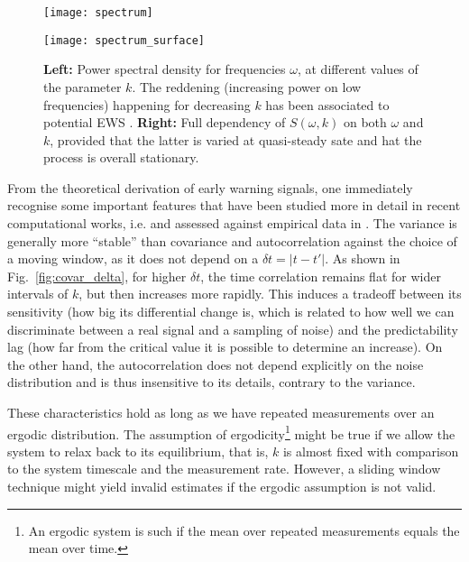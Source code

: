 \begin{figure}[h]
	\centering
	
	\begin{minipage}[c]{0.47\textwidth}
		\texttt{[image: spectrum]}
		\renewcommand{\figurename}{Fig.}
	\end{minipage}
	\hspace{0.01cm}
	\begin{minipage}[c]{0.47\textwidth}
		\texttt{[image: spectrum\_surface]}
		\renewcommand{\figurename}{Fig.}
	\end{minipage} 
	
	\caption{\small \textbf{Left:} Power spectral density for frequencies $\omega$, at different values of the parameter $k$. The reddening (increasing power on low frequencies) happening for decreasing $k$ has been associated to potential \gls{EWS} \citep{thompson2011predicting,biggs2009turning}. \textbf{Right:} Full dependency of $S(\omega,k)$ on both $\omega$ and $k$, provided that the latter is varied at quasi-steady sate and hat the process is overall stationary.}
	\label{fig:spectral_reddening}
\end{figure}


From the theoretical derivation of early warning signals, one immediately recognise some important features that have been studied more in detail in recent computational works, i.e. \citep{kuehn2013mathematical,dessavre2019problem,brett2017anticipating,o2018stochasticity} and assessed against empirical data in \citep{proverbio2022performance}. The variance is generally more ``stable'' than covariance and autocorrelation against the choice of a moving window, as it does not depend on a $\delta t = |t-t'|$. As shown in Fig.~\ref{fig:covar_delta}, for higher $\delta t$, the time correlation remains flat for wider intervals of $k$, but then increases more rapidly. This induces a tradeoff between its sensitivity (how big its differential change is, which is related to how well we can discriminate between a real signal and a sampling of noise) and the predictability lag (how far from the critical value it is possible to determine an increase). On the other hand, the autocorrelation does not depend explicitly on the noise distribution and is thus insensitive to its details, contrary to the variance. 

These characteristics hold as long as we have repeated measurements over an ergodic distribution. The assumption of ergodicity\footnote{An ergodic system is such if the mean over repeated measurements equals the mean over time.} might be true if we allow the system to relax back to its equilibrium, that is, $k$ is almost fixed with comparison to the system timescale and the measurement rate. However, a sliding window technique might yield invalid estimates if the ergodic assumption is not valid.


